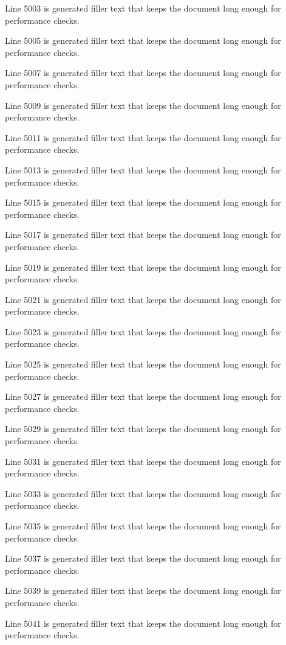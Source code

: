 Line 5003 is generated filler text that keeps the document long enough for performance checks.

Line 5005 is generated filler text that keeps the document long enough for performance checks.

Line 5007 is generated filler text that keeps the document long enough for performance checks.

Line 5009 is generated filler text that keeps the document long enough for performance checks.

Line 5011 is generated filler text that keeps the document long enough for performance checks.

Line 5013 is generated filler text that keeps the document long enough for performance checks.

Line 5015 is generated filler text that keeps the document long enough for performance checks.

Line 5017 is generated filler text that keeps the document long enough for performance checks.

Line 5019 is generated filler text that keeps the document long enough for performance checks.

Line 5021 is generated filler text that keeps the document long enough for performance checks.

Line 5023 is generated filler text that keeps the document long enough for performance checks.

Line 5025 is generated filler text that keeps the document long enough for performance checks.

Line 5027 is generated filler text that keeps the document long enough for performance checks.

Line 5029 is generated filler text that keeps the document long enough for performance checks.

Line 5031 is generated filler text that keeps the document long enough for performance checks.

Line 5033 is generated filler text that keeps the document long enough for performance checks.

Line 5035 is generated filler text that keeps the document long enough for performance checks.

Line 5037 is generated filler text that keeps the document long enough for performance checks.

Line 5039 is generated filler text that keeps the document long enough for performance checks.

Line 5041 is generated filler text that keeps the document long enough for performance checks.


